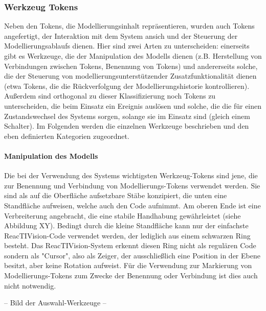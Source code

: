 
\subsubsection{Werkzeug Tokens} %
\label{ssub:werkzeug_tokens}

Neben den Tokens, die Modellierungsinhalt repräsentieren, wurden auch Tokens angefertigt, der Interaktion mit dem System ansich und der Steuerung der Modellierungsablaufs dienen. Hier sind zwei Arten zu unterscheiden: einerseits gibt es Werkzeuge, die der Manipulation des Modells dienen (z.B. Herstellung von Verbindungen zwischen Tokens, Benennung von Tokens) und andererseits solche, die der Steuerung von modellierungsunterstützender Zusatzfunktionalität dienen (etwa Tokens, die die Rückverfolgung der Modellierungshistorie kontrollieren). Außerdem sind orthogonal zu dieser Klassifizierung noch Tokens zu unterscheiden, die beim Einsatz ein Ereignis auslösen und solche, die die für einen Zustandswechsel des Systems sorgen, solange sie im Einsatz sind (gleich einem Schalter). Im Folgenden werden die einzelnen Werkzeuge beschrieben und den eben definierten Kategorien zugeordnet.

\paragraph{Manipulation des Modells} %
\label{par:manipulation_des_modells}

Die bei der Verwendung des Systems wichtigsten Werkzeug-Tokens sind jene, die zur Benennung und Verbindung von Modellierungs-Tokens verwendet werden. Sie sind als auf die Oberfläche aufsetzbare Stäbe konzipiert, die unten eine Standfläche aufweisen, welche auch den Code aufnimmt. Am oberen Ende ist eine Verbreiterung angebracht, die eine stabile Handhabung gewährleistet (siehe Abbildung XY). Bedingt durch die kleine Standfläche kann nur der einfachste ReacTIVision-Code verwendet werden, der lediglich aus einem schwarzen Ring besteht. Das ReacTIVision-System erkennt diesen Ring nicht als regulären Code sondern als "Cursor", also als Zeiger, der ausschließlich eine Position in der Ebene besitzt, aber keine Rotation aufweist. Für die Verwendung zur Markierung von Modellierungs-Tokens zum Zwecke der Benennung oder Verbindung ist dies auch nicht notwendig.

-- Bild der Auswahl-Werkzeuge --

